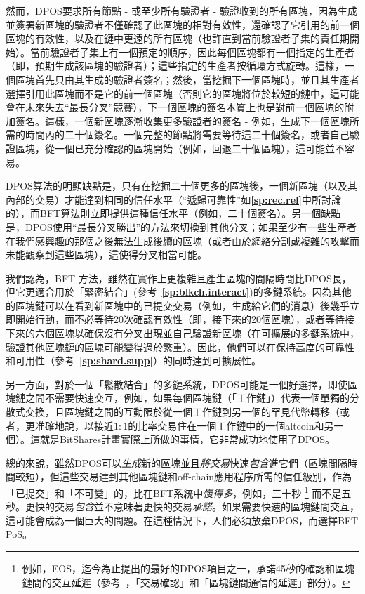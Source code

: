 \documentclass[12pt,oneside]{article}
\def\refpoint#1{{\rm\textbf{\ref{#1}}}}
\let\ptref=\refpoint
\begin{document}
然而，DPOS要求所有節點 - 或至少所有驗證者 - 驗證收到的所有區塊，因為生成並簽署新區塊的驗證者不僅確認了此區塊的相對有效性，還確認了它引用的前一個區塊的有效性，以及在鏈中更遠的所有區塊（也許直到當前驗證者子集的責任期開始）。當前驗證者子集上有一個預定的順序，因此每個區塊都有一個指定的生產者（即，預期生成該區塊的驗證者）；這些指定的生產者按循環方式旋轉。這樣，一個區塊首先只由其生成的驗證者簽名；然後，當挖掘下一個區塊時，並且其生產者選擇引用此區塊而不是它的前一個區塊（否則它的區塊將位於較短的鏈中，這可能會在未來失去“最長分叉”競賽），下一個區塊的簽名本質上也是對前一個區塊的附加簽名。這樣，一個新區塊逐漸收集更多驗證者的簽名 - 例如，生成下一個區塊所需的時間內的二十個簽名。一個完整的節點將需要等待這二十個簽名，或者自己驗證區塊，從一個已充分確認的區塊開始（例如，回退二十個區塊），這可能並不容易。

DPOS算法的明顯缺點是，只有在挖掘二十個更多的區塊後，一個新區塊（以及其內部的交易）才能達到相同的信任水平（“遞歸可靠性”如\ptref{sp:rec.rel}中所討論的），而BFT算法則立即提供這種信任水平（例如，二十個簽名）。另一個缺點是，DPOS使用“最長分叉勝出”的方法來切換到其他分叉；如果至少有一些生產者在我們感興趣的那個之後無法生成後續的區塊（或者由於網絡分割或複雜的攻擊而未能觀察到這些區塊），這使得分叉相當可能。


我們認為，BFT 方法，雖然在實作上更複雜且產生區塊的間隔時間比DPOS長，但它更適合用於「緊密結合」(參考~\ptref{sp:blkch.interact})的多鏈系統。因為其他的區塊鏈可以在看到新區塊中的已提交交易（例如，生成給它們的消息）後幾乎立即開始行動，而不必等待20次確認有效性（即，接下來的20個區塊），或者等待接下來的六個區塊以確保沒有分叉出現並自己驗證新區塊（在可擴展的多鏈系統中，驗證其他區塊鏈的區塊可能變得過於繁重）。因此，他們可以在保持高度的可靠性和可用性（參考~\ptref{sp:shard.supp}）的同時達到可擴展性。

另一方面，對於一個「鬆散結合」的多鏈系統，DPOS可能是一個好選擇，即使區塊鏈之間不需要快速交互，例如，如果每個區塊鏈（「工作鏈」）代表一個單獨的分散式交換，且區塊鏈之間的互動限於從一個工作鏈到另一個的罕見代幣轉移（或者，更准確地說，以接近$1:1$的比率交易住在一個工作鏈中的一個altcoin和另一個）。這就是BitShares計畫實際上所做的事情，它非常成功地使用了DPOS。

總的來說，雖然DPOS可以\emph{生成}新的區塊並且\emph{將交易}快速\emph{包含}進它們（區塊間隔時間較短），但這些交易達到其他區塊鏈和off-chain應用程序所需的信任級別，作為「已提交」和「不可變」的，比在BFT系統中\emph{慢得多}，例如，三十秒%
\footnote{例如，EOS，迄今為止提出的最好的DPOS項目之一，承諾45秒的確認和區塊鏈間的交互延遲（參考~\cite{EOSWP}，「交易確認」和「區塊鏈間通信的延遲」部分）。}
而不是五秒。更快的交易\emph{包含}並不意味著更快的交易\emph{承諾}。如果需要快速的區塊鏈間交互，這可能會成為一個巨大的問題。在這種情況下，人們必須放棄DPOS，而選擇BFT PoS。
\end{document}
